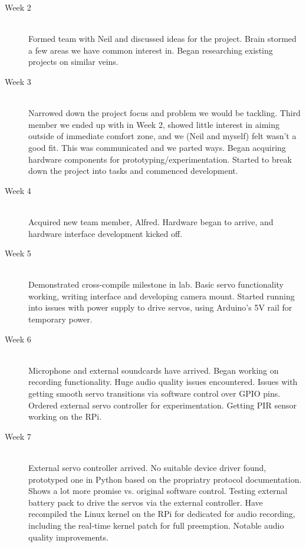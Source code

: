 \documentclass[11pt,a4paper,titlepage]{report}
\begin{document}
\begin{description}

  \item[Week 2] \hfill \\
    Formed team with Neil and discussed ideas for the project. Brain stormed a few areas we have common interest in. Began researching existing projects on similar veins.
  \item[Week 3] \hfill \\
    Narrowed down the project focus and problem we would be tackling.
    Third member we ended up with in Week 2, showed little interest in aiming outside of immediate comfort zone, and we (Neil and myself) felt wasn't a good fit. This was communicated and we parted ways.
    Began acquiring hardware components for prototyping/experimentation.
    Started to break down the project into tasks and commenced development.
  \item[Week 4] \hfill \\
   Acquired new team member, Alfred.
   Hardware began to arrive, and hardware interface development kicked off.
  \item[Week 5] \hfill \\
    Demonstrated cross-compile milestone in lab.
    Basic servo functionality working, writing interface and developing camera mount. Started running into issues with power supply to drive servos, using Arduino's 5V rail for temporary power.

  \item[Week 6] \hfill \\
    Microphone and external soundcards have arrived. Began working on recording functionality. Huge audio quality issues encountered.
    Issues with getting smooth servo transitions via software control over GPIO pins. Ordered external servo controller for experimentation.
    Getting PIR sensor working on the RPi.
  \item[Week 7] \hfill \\
    External servo controller arrived. No suitable device driver found, prototyped one in Python based on the propriatry protocol documentation. Shows a lot more promise vs. original software control. Testing external battery pack to drive the servos via the external controller.
    Have recompiled the Linux kernel on the RPi for dedicated for audio recording, including the real-time kernel patch for full preemption. Notable audio quality improvements.


\end{description}
\end{document}
